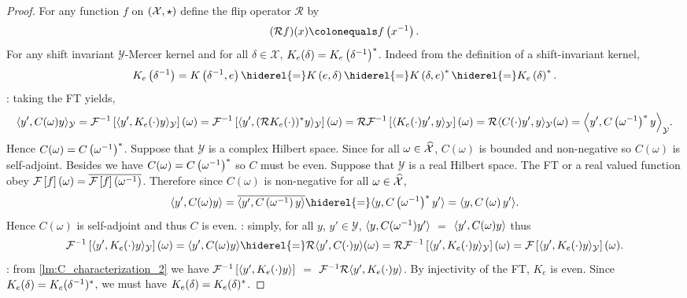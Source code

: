 \begin{proof}
For any function $f$ on $(\mathcal{X},\star)$ define the flip operator $\mathcal{R}$ by
\begin{dmath*}
(\mathcal{R}f)(x) \colonequals f\left(\inv{x}\right).
\end{dmath*}
For any shift invariant $\mathcal{Y}$-Mercer kernel and for all $\delta\in\mathcal{X}$,  $K_e(\delta)=K_e\left({\delta}^{-1}\right)^*$. Indeed from the definition of a shift-invariant kernel,
\begin{dmath*}
K_e\left(\inv{\delta}\right)=K\left(\inv{\delta},e\right)\hiderel{=}K\left(e,\delta\right)\hiderel{=}K\left(\delta,e\right)^\adjoint
\hiderel{=}K_e\left(\delta\right)^\adjoint.
\end{dmath*}
: taking the \acl{FT} yields,
\begin{dmath*}
\inner{y',C(\omega)y}_{\mathcal{Y}}=\IFT{\inner{y', K_e(\cdot)y}_{\mathcal{Y}}}(\omega)
=\IFT{\inner{y', (\mathcal{R}K_e(\cdot))^\adjoint y}_{\mathcal{Y}}}(\omega)
=\mathcal{R}\IFT{\inner{K_e(\cdot)y', y}_{\mathcal{Y}}}(\omega)
=\mathcal{R}\inner{C(\cdot)y',y}_{\mathcal{Y}}(\omega)
=\inner*{y',C\left(\inv{\omega}\right)^\adjoint y}_{\mathcal{Y}}.
\end{dmath*}
Hence $C(\omega)=C\left({\omega}^{-1}\right)^*$. Suppose that $\mathcal{Y}$ is a complex Hilbert space. Since for all $\omega\in\mathcal{\widehat{X}}$, $C(\omega)$ is bounded and non-negative so $C(\omega)$ is self-adjoint. Besides we have $C(\omega)=C\left({\omega}^{-1}\right)^* $ so $C$ must be even. Suppose that $\mathcal{Y}$ is a real Hilbert space. The \acl{FT} or a real valued function obey $\mathcal{F}\left[f\right](\omega)=\overline{\mathcal{F}\left[f\right]\left({\omega}^{-1}\right)}$. Therefore since $C(\omega)$ is non-negative for all $\omega\in\widehat{\mathcal{X}}$,
\begin{dmath*}
\inner{y', C(\omega)y}=\conj{\inner{y', C\left(\inv{\omega}\right)y}}\hiderel{=}\inner{y, C\left(\inv{\omega}\right)^* y'}
=\inner{y, C\left(\omega\right) y'}.
\end{dmath*}
Hence $C(\omega)$ is self-adjoint and thus $C$ is even. : simply, for all $y$, $y'\in\mathcal{Y}$, $\langle y, C({\omega}^{-1})y'\rangle$ $=$ $\langle y', C(\omega)y\rangle$ thus
\begin{dmath*}
\IFT{\inner{y', K_e(\cdot)y}_{\mathcal{Y}}}(\omega)=\inner{y', C(\omega)y}\hiderel{=}\mathcal{R}\inner{y', C(\cdot)y}(\omega)=\mathcal{R}\IFT{\inner{y', K_e(\cdot)y}_{\mathcal{Y}}}(\omega)=\FT{\inner{y', K_e(\cdot)y}_{\mathcal{Y}}}(\omega).
\end{dmath*}
: from \cref{lm:C_characterization_2} we have $\mathcal{F}^{-1}\left[\langle y', K_e(\cdot)y\rangle\right]$ $=$ $\mathcal{F}^{-1}\mathcal{R}{\langle y', K_e(\cdot)y\rangle}$. By injectivity of the \acl{FT}, $K_e$ is even. Since $K_e(\delta)=K_e({\delta}^{-1})^* $, we must have $K_e(\delta)=K_e(\delta)^* $.
\end{proof}
